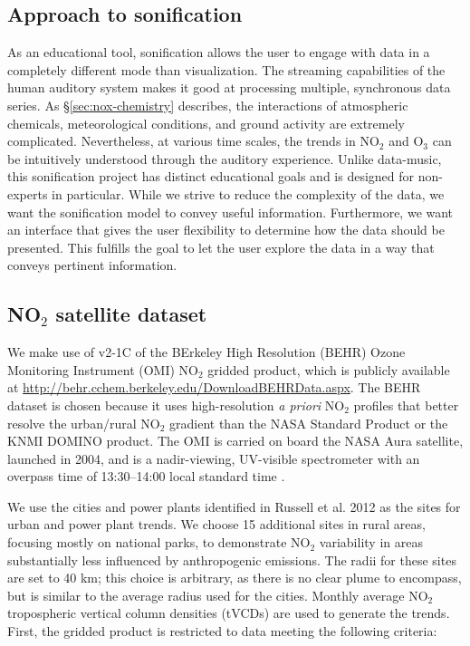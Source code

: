 \documentclass[a4paper,10pt,oneside]{article}
\newcommand{\ce}[1]{$\mathrm{#1}$}
\begin{document}
\begin{sloppy}
\section{Approach to sonification}
As an educational tool, sonification allows the user to engage with data in a completely different mode than visualization. The streaming capabilities of the human auditory system makes it good at processing multiple, synchronous data series. As \S \ref{sec:nox-chemistry} describes, the interactions of atmospheric chemicals, meteorological conditions, and ground activity are extremely complicated. Nevertheless, at various time scales, the trends in \ce{NO_2} and \ce{O_3} can be intuitively understood through the auditory experience. Unlike data-music, this sonification project has distinct educational goals and is designed for non-experts in particular. While we strive to reduce the complexity of the data, we want the sonification model to convey useful information.  Furthermore, we want an interface that gives the user flexibility to determine how the data should be presented.  This fulfills the goal to let the user explore the data in a way that conveys pertinent information.  

\subsection{NO$_2$ satellite dataset}
	We make use of v2-1C of the BErkeley High Resolution (BEHR) Ozone Monitoring Instrument (OMI) \ce{NO_2} gridded product, which is publicly available at \url{http://behr.cchem.berkeley.edu/DownloadBEHRData.aspx}. The BEHR dataset is chosen because it uses high-resolution \emph{a priori} \ce{NO_2} profiles that better resolve the urban/rural \ce{NO_2} gradient than the NASA Standard Product or the KNMI DOMINO product. The OMI is carried on board the NASA Aura satellite, launched in 2004, and is a nadir-viewing, UV-visible spectrometer with an overpass time of 13:30--14:00 local standard time \cite{levelt06}.
	
	We use the cities and power plants identified in Russell et al. 2012 \cite{russell12} as the sites for urban and power plant trends. We choose 15 additional sites in rural areas, focusing mostly on national parks, to demonstrate \ce{NO_2} variability in areas substantially less influenced by anthropogenic emissions. The radii for these sites are set to 40 km; this choice is arbitrary, as there is no clear plume to encompass, but is similar to the average radius used for the cities. Monthly average \ce{NO_2} tropospheric vertical column densities (tVCDs) are used to generate the trends. First, the gridded product is restricted to data meeting the following criteria:
	

\end{sloppy}
\end{document}
